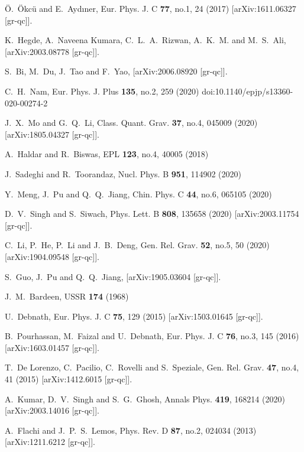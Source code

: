 \documentclass[aps,11pt]{revtex4}
\begin{document}
\begin{thebibliography}{99}
{
\"O.~\"Okc\"u and E.~Ayd\i{}ner,
Eur. Phys. J. C \textbf{77}, no.1, 24 (2017)
[arXiv:1611.06327 [gr-qc]].


K.~Hegde, A.~Naveena Kumara, C.~L.~A.~Rizwan, A.~K.~M. and M.~S.~Ali,
[arXiv:2003.08778 [gr-qc]].


S.~Bi, M.~Du, J.~Tao and F.~Yao,
[arXiv:2006.08920 [gr-qc]].


C.~H.~Nam,
Eur. Phys. J. Plus \textbf{135}, no.2, 259 (2020)
doi:10.1140/epjp/s13360-020-00274-2


J.~X.~Mo and G.~Q.~Li,
Class. Quant. Grav. \textbf{37}, no.4, 045009 (2020)
[arXiv:1805.04327 [gr-qc]].


A.~Haldar and R.~Biswas,
EPL \textbf{123}, no.4, 40005 (2018)


J.~Sadeghi and R.~Toorandaz,
Nucl. Phys. B \textbf{951}, 114902 (2020)


Y.~Meng, J.~Pu and Q.~Q.~Jiang,
Chin. Phys. C \textbf{44}, no.6, 065105 (2020)


D.~V.~Singh and S.~Siwach,
Phys. Lett. B \textbf{808}, 135658 (2020)
[arXiv:2003.11754 [gr-qc]].


C.~Li, P.~He, P.~Li and J.~B.~Deng,
Gen. Rel. Grav. \textbf{52}, no.5, 50 (2020)
[arXiv:1904.09548 [gr-qc]].


S.~Guo, J.~Pu and Q.~Q.~Jiang,
[arXiv:1905.03604 [gr-qc]].


J.~M.~Bardeen,
USSR \textbf{174} (1968)

U.~Debnath,
Eur. Phys. J. C \textbf{75}, 129 (2015)
[arXiv:1503.01645 [gr-qc]].


B.~Pourhassan, M.~Faizal and U.~Debnath,
Eur. Phys. J. C \textbf{76}, no.3, 145 (2016)
[arXiv:1603.01457 [gr-qc]].


T.~De Lorenzo, C.~Pacilio, C.~Rovelli and S.~Speziale,
Gen. Rel. Grav. \textbf{47}, no.4, 41 (2015)
[arXiv:1412.6015 [gr-qc]].


A.~Kumar, D.~V.~Singh and S.~G.~Ghosh,
Annals Phys. \textbf{419}, 168214 (2020)
[arXiv:2003.14016 [gr-qc]].


A.~Flachi and J.~P.~S.~Lemos,
Phys. Rev. D \textbf{87}, no.2, 024034 (2013)
[arXiv:1211.6212 [gr-qc]].


}
\end{thebibliography}
\end{document}
